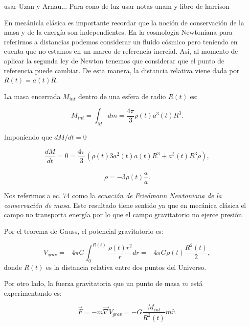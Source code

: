 \documentclass{article}
\begin{document}
   usar Uzan y Arnau...
    Para cono de luz usar notas unam y libro de harrison 
    
    En mecánicla clásica es importante recordar que la noción de conservación de la masa y de la energía son independientes. En la cosmología Newtoniana para referirnos a distancias podemos considerar un fluido cósmico pero teniendo en cuenta que no estamos en un marco de referencia inercial. Así, al momento de aplicar la segunda ley de Newton tenemos que considerar que el punto de referencia puede cambiar. De esta manera, la distancia relativa viene dada por $R(t) = a(t) R$.
    
    La masa  encerrada $M_{int}$ dentro de una esfera de radio $R(t)$ es: 
    
    \begin{equation}
        M_{int} = \int_M{dm} = \frac{4\pi}{3} \rho(t) a^3(t) R^3.
    \end{equation}
    
    Imponiendo que $dM/dt=0$
    
    \[
    \frac{dM}{dt}   = 0 =  \frac{4\pi}{3} \left( \rho(t)3 a^2(t) \dot{a}(t)  R^3 + a^3(t) R^3 \dot{\rho} \right), \]
    
    \begin{equation}
        \boxed{\dot{\rho} = -3 \rho(t) \frac{\dot{a}}{a}.}
    \end{equation}
     
    Nos referimos a ec. 74 como la {\textit{ecuación de Friedmann Newtoniana de la conservación de masa}}. Este resultado tiene sentido ya que en mecánica clásica el campo no transporta energía por lo que el campo gravitatorio no ejerce presión. 
    
    
    Por el teorema de Gauss, el potencial gravitatorio es: 
    
    \begin{equation}
        V_{grav} = -4 \pi G \int_0^{R(t)}{\frac{\rho(t)r^2}{r}dr} = -4 \pi G \rho(t) \frac{R^2(t)}{2},
    \end{equation}
    donde $R(t)$ es la distancia relativa entre dos puntos del Universo. 
    
    
    Por otro lado, la fuerza gravitatoria que un punto de masa $m$ está experimentando es: 
    
    \begin{equation}
        \vec{F} = -m \vec{\nabla} V_{grav} = - G \frac{M_{int}}{R^2(t)} m \hat{r}.
    \end{equation}
    
\end{document}
